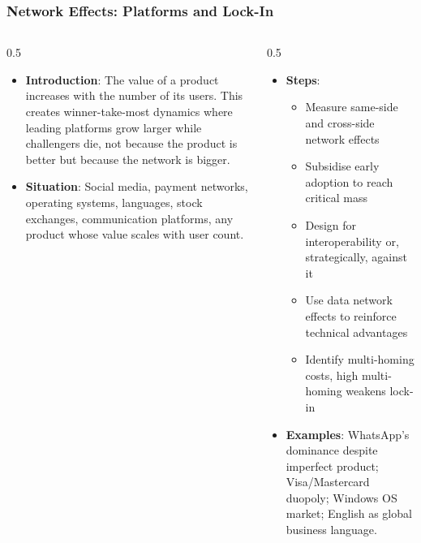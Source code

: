 \begin{frame}[fragile]\frametitle{Network Effects: Platforms and Lock-In}
\begin{columns}
    \begin{column}[T]{0.5\linewidth}
      \begin{itemize}
        \item \textbf{Introduction}: The value of a product increases with the number of its users. This creates winner-take-most dynamics where leading platforms grow larger while challengers die, not because the product is better but because the network is bigger.
        \item \textbf{Situation}: Social media, payment networks, operating systems, languages, stock exchanges, communication platforms, any product whose value scales with user count.
      \end{itemize}
    \end{column}
    \begin{column}[T]{0.5\linewidth}
      \begin{itemize}
        \item \textbf{Steps}:
        \begin{itemize}
          \item Measure same-side and cross-side network effects
          \item Subsidise early adoption to reach critical mass
          \item Design for interoperability or, strategically, against it
          \item Use data network effects to reinforce technical advantages
          \item Identify multi-homing costs, high multi-homing weakens lock-in
        \end{itemize}\item \textbf{Examples}: WhatsApp's dominance despite imperfect product; Visa/Mastercard duopoly; Windows OS market; English as global business language.
      \end{itemize}
    \end{column}
  \end{columns}
\end{frame}

